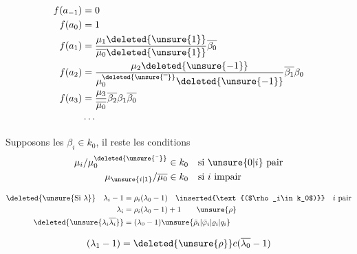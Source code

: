 \[
\begin{aligned}
f(a_{-1})&=0\\
f(a_0)&=1\\
f(a_1)&=\frac{\mu_1\deleted{\unsure{1}}}{\overline{\mu_0}\deleted{\unsure{1}}}\overline{\beta_0}\\
f(a_2)&=\frac{\mu_2\deleted{\unsure{-1}}}{\mu_0^{\deleted{\unsure{\overline{\phantom{a}}}}}\deleted{\unsure{-1}}}\overline{\beta_1}\beta_0\\
f(a_3)&=\frac{\mu_3}{\overline{\mu_0}}\overline{\beta_2}\beta_1\overline{\beta_0}\\
&\cdots
\end{aligned}
\]

Supposons les $\beta_i\in k_0$, il reste les conditions
\[
\begin{aligned}
\mu_i/\mu_0^{\deleted{\unsure{\bar{\phantom{a}}}}}&\in k_0\quad\text{si }\unsure{0|i}\text{ pair}\\
\mu_{\unsure{i|1}}/\overline{\mu_0}&\in k_0\quad\text{si }i\text{ impair}
\end{aligned}
\]

\[
\begin{aligned}
\deleted{\unsure{\text{Si }\lambda}}\quad\lambda_i-1&=\rho_i(\lambda_0-1)
\quad \inserted{\text{($\rho_i\in k_0$)}}\quad i\text{ pair}\\
\lambda_i&=\rho_i(\lambda_0-1)+1\qquad\unsure{\rho}\\
\deleted{\unsure{\lambda_i\overline{\lambda_i}}}&=(\lambda_0-1)\unsure{\bar\rho_i|\bar\varphi_i|\varrho_i|q_i}
\end{aligned}
\]

 

\[
(\lambda_1-1)=\deleted{\unsure{\rho}}c(\overline{\lambda_0}-1)
\]


